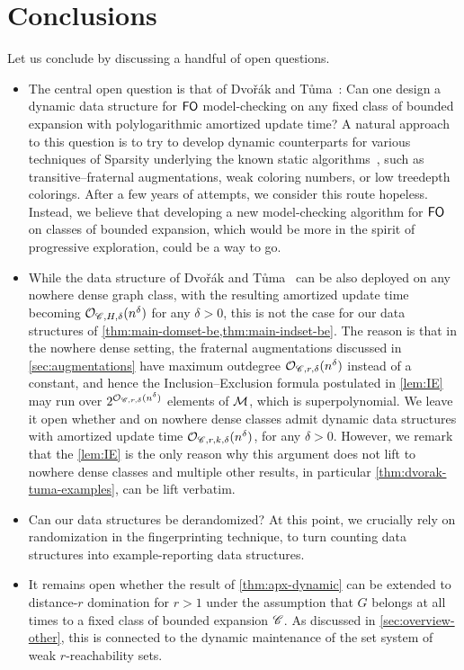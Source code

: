\section{Conclusions}\label{sec:conclusions}

Let us conclude by discussing a handful of open questions.
\begin{itemize}
	\item The central open question is that of Dvo\v{r}\'ak and T\r{u}ma~\cite{DvorakT13}: Can one design a dynamic data structure for $\FO$ model-checking on any fixed  class of bounded expansion with polylogarithmic amortized update time? A natural approach to this question is to try to develop dynamic counterparts for various techniques of Sparsity underlying the known static algorithms~\cite{DvorakKT13,grohe2011methods,PilipczukST18}, such as transitive--fraternal augmentations, weak coloring numbers, or low treedepth colorings. After a few years of attempts, we consider this route hopeless. Instead, we believe that developing a new model-checking algorithm for $\FO$ on classes of bounded expansion, which would be more in the spirit of progressive exploration, could be a way to go.
	\item While the data structure of Dvo\v{r}\'ak and T\r{u}ma~\cite{DvorakT13} can be also deployed on any nowhere dense graph class, with the resulting amortized update time becoming $\Oh_{\Cc,H,\delta}(n^\delta)$ for any $\delta>0$, this is not the case for our data structures of \cref{thm:main-domset-be,thm:main-indset-be}. The reason is that in the nowhere dense setting, the fraternal augmentations discussed in \cref{sec:augmentations} have maximum outdegree $\Oh_{\Cc,r,\delta}(n^\delta)$ instead of a constant, and hence the Inclusion--Exclusion formula postulated in \cref{lem:IE} may run over $2^{\Oh_{\Cc,r,\delta}(n^\delta)}$ elements of $\cal M$, which is superpolynomial. We leave it open whether  and  on nowhere dense classes admit dynamic data structures with amortized update time $\Oh_{\Cc,r,k,\delta}(n^\delta)$, for any $\delta>0$. However, we remark that the \cref{lem:IE} is the only reason why this argument does not lift to nowhere dense classes and multiple other results, in particular \cref{thm:dvorak-tuma-examples}, can be lift verbatim.
	\item Can our data structures be derandomized? At this point, we crucially rely on randomization in the fingerprinting technique, to turn counting data structures into example-reporting data structures.
	\item It remains open whether the result of \cref{thm:apx-dynamic} can be extended to distance-$r$ domination for $r>1$ under the assumption that $G$ belongs at all times to a fixed class of bounded expansion $\Cc$. As discussed in \cref{sec:overview-other}, this is connected to the dynamic maintenance of the set system of weak $r$-reachability sets.
\end{itemize}
